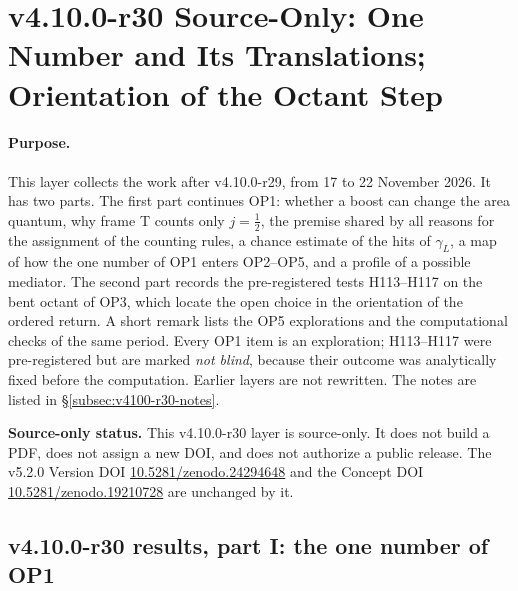\clearpage
\section*{v4.10.0-r30 Source-Only: One Number and Its Translations; Orientation of the Octant Step}
\label{sec:v4100-r30-translations}

\paragraph{Purpose.}
This layer collects the work after v4.10.0-r29, from 17 to 22 November 2026.  It has two parts.  The first part continues OP1: whether a boost can
change the area quantum, why frame T counts only \(j=\tfrac12\), the premise shared by all reasons for the assignment of the counting rules, a chance
estimate of the hits of \(\gamma_L\), a map of how the one number of OP1 enters OP2--OP5, and a profile of a possible mediator.  The second part
records the pre-registered tests H113--H117 on the bent octant of OP3, which locate the open choice in the orientation of the ordered return.  A short
remark lists the OP5 explorations and the computational checks of the same period.  Every OP1 item is an exploration; H113--H117 were pre-registered
but are marked \emph{not blind}, because their outcome was analytically fixed before the computation.  Earlier layers are not rewritten.  The notes
are listed in \S\ref{subsec:v4100-r30-notes}.

\noindent\textbf{Source-only status.}
This v4.10.0-r30 layer is source-only.  It does not build a PDF, does not assign a new DOI,
and does not authorize a public release.  The v5.2.0 Version DOI
\href{https://doi.org/10.5281/zenodo.24294648}{10.5281/zenodo.24294648} and the Concept DOI
\href{https://doi.org/10.5281/zenodo.19210728}{10.5281/zenodo.19210728} are unchanged by it.

\subsection*{v4.10.0-r30 results, part I: the one number of OP1}
\label{subsec:v4100-r30-results-op1}

